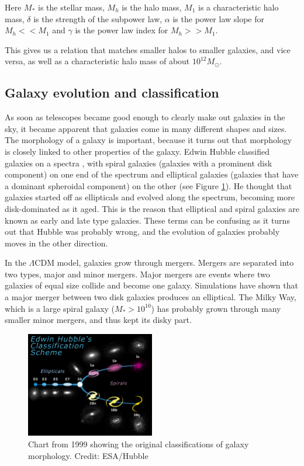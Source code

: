 Here $M_*$ is the stellar mass, $M_h$ is the halo mass, $M_1$ is a characteristic halo mass, $\delta$ is the strength of the subpower law, $\alpha$ is the power law slope for $M_h << M_1$ and $\gamma$ is the power law index for $M_h >> M_1$.

This gives us a relation that matches smaller halos to smaller galaxies, and vice versa, as well as a characteristic halo mass of about $10^{12}M_{\odot}$.

\subsection{Galaxy evolution and classification}
As soon as telescopes became good enough to clearly make out galaxies in the sky, it became apparent that galaxies come in many different shapes and sizes. The morphology of a galaxy is important, because it turns out that morphology is closely linked to other properties of the galaxy. Edwin Hubble classified galaxies on a spectra \parencite{Hubble1926}, with spiral galaxies (galaxies with a prominent disk component) on one end of the spectrum and elliptical galaxies (galaxies that have a dominant spheroidal component) on the other (see Figure \ref{hubble}). He thought that galaxies started off as ellipticals and evolved along the spectrum, becoming more disk-dominated as it aged. This is the reason that elliptical and spiral galaxies are known as early and late type galaxies. These terms can be confusing as it turns out that Hubble was probably wrong, and the evolution of galaxies probably moves in the other direction. 

In the $\Lambda$CDM model, galaxies grow through mergers. Mergers are separated into two types, major and minor mergers.  Major mergers are events where two galaxies of equal size collide and become one galaxy. Simulations have shown that a major merger between two disk galaxies produces an elliptical. The Milky Way, which is a large spiral galaxy ($M_*>10^{10}$) has probably grown through many smaller minor mergers, and thus kept its disky part.

\begin{figure}
    \centering
    \includegraphics[width=0.5\textwidth]{images/hubble.jpg}
    \caption{Chart from 1999 showing the original classifications of galaxy morphology. Credit: ESA/Hubble}
    \label{hubble}
\end{figure}

